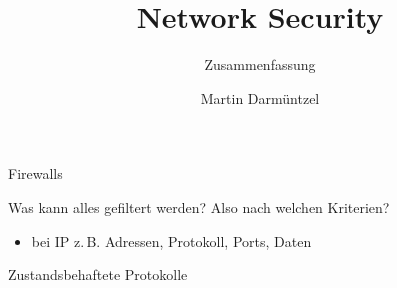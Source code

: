 \documentclass[
a4paper, %
11pt,
]
{scrartcl}
\title{Network Security}
\subtitle{Zusammenfassung}
\author{Martin Darmüntzel}
\begin{document}
\maketitle

\tableofcontents

\pagebreak



Firewalls

Was kann alles gefiltert werden? Also nach welchen Kriterien?
\begin{itemize}
  \item bei IP z.\,B. Adressen, Protokoll, Ports, Daten
\end{itemize}

Zustandsbehaftete Protokolle

\pagebreak

\listoftodos
\end{document}
